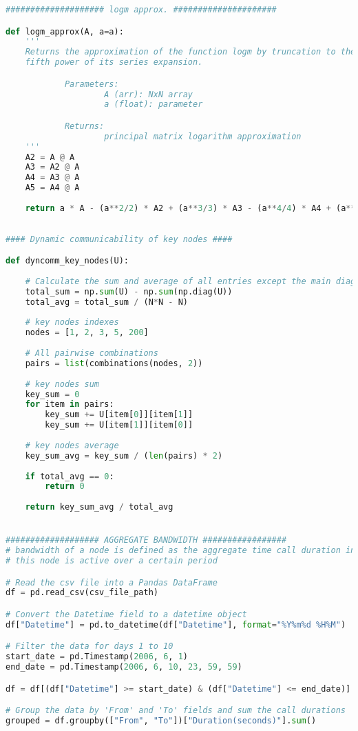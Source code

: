 \begin{lstlisting}[language=Python, caption=Voice call experiment]
#################### logm approx. #####################

def logm_approx(A, a=a):
    '''
    Returns the approximation of the function logm by truncation to the 
    fifth power of its series expansion.

            Parameters:
                    A (arr): NxN array 
                    a (float): parameter

            Returns:
                    principal matrix logarithm approximation 
    '''
    A2 = A @ A
    A3 = A2 @ A
    A4 = A3 @ A
    A5 = A4 @ A
    
    return a * A - (a**2/2) * A2 + (a**3/3) * A3 - (a**4/4) * A4 + (a**5/5) * A5
    
        
#### Dynamic communicability of key nodes ####

def dyncomm_key_nodes(U):
    
    # Calculate the sum and average of all entries except the main diagonal
    total_sum = np.sum(U) - np.sum(np.diag(U))
    total_avg = total_sum / (N*N - N)
    
    # key nodes indexes
    nodes = [1, 2, 3, 5, 200]
    
    # All pairwise combinations
    pairs = list(combinations(nodes, 2))
    
    # key nodes sum
    key_sum = 0
    for item in pairs:
        key_sum += U[item[0]][item[1]]
        key_sum += U[item[1]][item[0]] 
        
    # key nodes average
    key_sum_avg = key_sum / (len(pairs) * 2)
    
    if total_avg == 0:
        return 0
    
    return key_sum_avg / total_avg


################### AGGREGATE BANDWIDTH #################
# bandwidth of a node is defined as the aggregate time call duration in which 
# this node is active over a certain period 

# Read the csv file into a Pandas DataFrame
df = pd.read_csv(csv_file_path)

# Convert the Datetime field to a datetime object
df["Datetime"] = pd.to_datetime(df["Datetime"], format="%Y%m%d %H%M")

# Filter the data for days 1 to 10
start_date = pd.Timestamp(2006, 6, 1)
end_date = pd.Timestamp(2006, 6, 10, 23, 59, 59)

df = df[(df["Datetime"] >= start_date) & (df["Datetime"] <= end_date)]

# Group the data by 'From' and 'To' fields and sum the call durations
grouped = df.groupby(["From", "To"])["Duration(seconds)"].sum()


\end{lstlisting}
